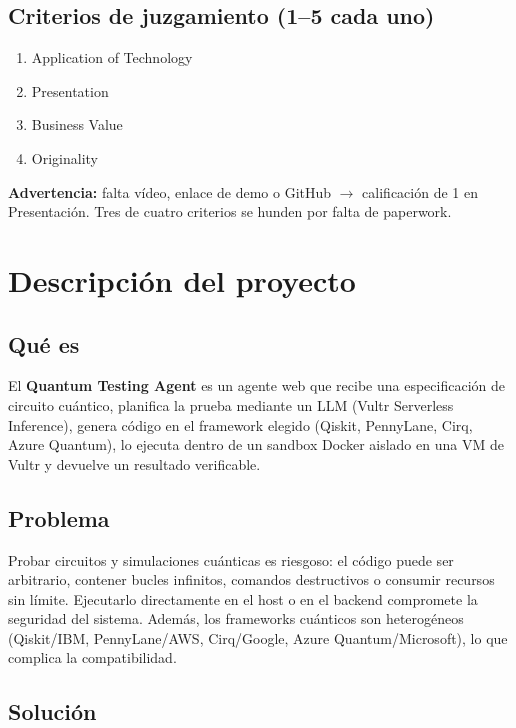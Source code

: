 \documentclass[11pt,a4paper]{article}
\begin{document}
\subsection{Criterios de juzgamiento (1--5 cada uno)}

\begin{enumerate}
    \item Application of Technology
    \item Presentation
    \item Business Value
    \item Originality
\end{enumerate}

\textbf{Advertencia:} falta vídeo, enlace de demo o GitHub $\rightarrow$ calificación
de 1 en Presentación. Tres de cuatro criterios se hunden por falta de paperwork.

\section{Descripción del proyecto}

\subsection{Qué es}

El \textbf{Quantum Testing Agent} es un agente web que recibe una especificación
de circuito cuántico, planifica la prueba mediante un LLM (Vultr Serverless
Inference), genera código en el framework elegido (Qiskit, PennyLane, Cirq, Azure
Quantum), lo ejecuta dentro de un sandbox Docker aislado en una VM de Vultr y
devuelve un resultado verificable.

\subsection{Problema}

Probar circuitos y simulaciones cuánticas es riesgoso: el código puede ser
arbitrario, contener bucles infinitos, comandos destructivos o consumir recursos
sin límite. Ejecutarlo directamente en el host o en el backend compromete la
seguridad del sistema. Además, los frameworks cuánticos son heterogéneos
(Qiskit/IBM, PennyLane/AWS, Cirq/Google, Azure Quantum/Microsoft), lo que
complica la compatibilidad.

\subsection{Solución}
\end{document}
